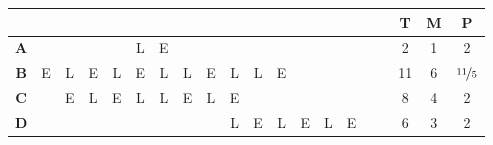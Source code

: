 \begin{ejercicio}
\begin{enumerate}
        \begin{table}[H]
            \begin{tabular}{ccccccccccccccccc|ccc}
                                            &                        &                                &                                &                                &                        &                        &                                &                                &                                &                         &                         &                                &                                &                                &                         &    & \textbf{T} & \textbf{M} & \textbf{P} \\ \hline
            \multicolumn{1}{c|}{\textbf{A}} &                        &                                &                                &                                & L                      & E                      &                                &                                &                                &                         &                         &                                &                                &                                &                         &    & 2          & 1          & 2          \\ \hline
            \multicolumn{1}{c|}{\textbf{B}} & E                      & L                              & E                              & L                              & E                      & L                      & L                              & E                              & L                              & L                       & E                       &                                &                                &                                &                         &    & 11         & 6          & $\nicefrac{11}{5}$       \\ \hline
            \multicolumn{1}{c|}{\textbf{C}} &                        & E                              & L                              & E                              & L                      & L                      & E                              & L                              & E                              &                         &                         &                                &                                &                                &                         &    & 8          & 4          & 2          \\ \hline
            \multicolumn{1}{c|}{\textbf{D}} &                        &                                &                                &                                &                        &                        &                                &                                & L                              & E                       & L                       & E                              & L                              & E                              &                         &    & 6          & 3          & 2          \\ \hline

\end{tabular}
\end{table}
\end{enumerate}
\end{ejercicio}
